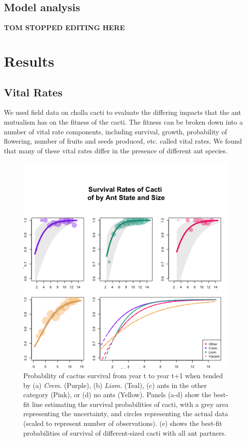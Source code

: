 \documentclass[12pt,a4paper]{article}
\begin{document}
 \subsection*{Model analysis}

\textbf{TOM STOPPED EDITING HERE}

\section*{Results}
\subsection*{Vital Rates}

We used field data on cholla cacti to evaluate the differing impacts that the ant mutualism has on the fitness of the cacti. The fitness can be broken down into a number of vital rate components, including survival, growth, probability of flowering, number of fruits and seeds produced, etc. called vital rates. We found that many of these vital rates differ in the presence of different ant species. 


\begin{figure}[!ht]
	\centering
	\includegraphics[width = 0.85\linewidth]{Figures/surv_panels_cropped.png}
	\caption{Probability of cactus survival from year t to year t+1 when tended by (a) \textit{Crem.} (Purple), (b) \textit{Liom.} (Teal), (c) ants in the other category (Pink), or (d) no ants (Yellow). Panels (a-d) show the best-fit line estimating the survival probabilities of cacti, with a grey area representing the uncertainty, and circles representing the actual data (scaled to represent number of observations). (e) shows the best-fit probabilities of survival of different-sized cacti with all ant partners.}
	\label{fig:surv}
\end{figure}
\end{document}
